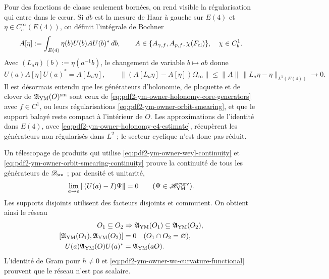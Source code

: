 Pour des fonctions de classe seulement bornées, on rend visible la régularisation qui
entre dans le cœur. Si $d b$ est la mesure de Haar à gauche sur $E(4)$ et
$\eta\in C_c^\infty(E(4))$, on définit l’intégrale de Bochner
\begin{equation}\label{eq:pdf2-ym-owner-orbit-smearing}
 A[\eta]:=\int_{E(4)}\eta(b)U(b)AU(b)^*\,db,
 \qquad A\in\{A_{\gamma,f},A_{p,f},\chi(F_{{\rm cl}})\},
 \quad \chi\in C_b^1.
\end{equation}
Avec $(L_a\eta)(b):=\eta(a^{-1}b)$, le changement de variable $b\mapsto ab$ donne
\begin{equation}\label{eq:pdf2-ym-owner-orbit-smearing-continuity}
 U(a)A[\eta]U(a)^*=A[L_a\eta],
 \qquad
 \|(A[L_a\eta]-A[\eta])\Omega_\infty\|
 \le\|A\|\,\|L_a\eta-\eta\|_{L^1(E(4))}\longrightarrow0.
\end{equation}
Il est désormais entendu que les générateurs d'holonomie, de plaquette et de clover de $\mathfrak A_{\rm YM}(O)^{\rm sm}$ sont ceux de \eqref{eq:pdf2-ym-owner-holonomy-core-generators} avec $f\in C^1$, ou leurs régularisations \eqref{eq:pdf2-ym-owner-orbit-smearing}, et que le support balayé reste compact à l'intérieur de $O$. Les approximations de l'identité dans $E(4)$, avec \eqref{eq:pdf2-ym-owner-holonomy-e4-estimate}, récupèrent les générateurs non régularisés dans $L^2$ ; le secteur cyclique n'est donc pas réduit.

Un télescopage de produits qui utilise
\eqref{eq:pdf2-ym-owner-weyl-continuity} et
\eqref{eq:pdf2-ym-owner-orbit-smearing-continuity} prouve la continuité de tous
les générateurs de $\mathscr D_{\rm sm}$ ; par
densité et unitarité,
\begin{equation}\label{eq:pdf2-ym-owner-strong-e4}
 \lim_{a\to e}\|(U(a)-I)\Psi\|=0
 \qquad(\Psi\in\mathscr H_{\rm YM}^{\rm curv}).
\end{equation}
Les supports disjoints utilisent des facteurs disjoints et commutent. On obtient ainsi le réseau
\begin{equation}\label{eq:pdf2-ym-owner-local-net}
\begin{aligned}
 O_1\subseteq O_2&\Rightarrow
 \mathfrak A_{\rm YM}(O_1)\subseteq\mathfrak A_{\rm YM}(O_2),\\
 [\mathfrak A_{\rm YM}(O_1),\mathfrak A_{\rm YM}(O_2)]&=0
 \quad (O_1\cap O_2=\varnothing),\\
 U(a)\mathfrak A_{\rm YM}(O)U(a)^*&=\mathfrak A_{\rm YM}(aO).
\end{aligned}
\end{equation}
L’identité de Gram pour $h\ne0$ et
\eqref{eq:pdf2-ym-owner-wc-curvature-functional} prouvent que le réseau n’est pas scalaire.

